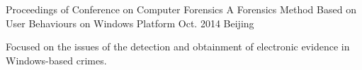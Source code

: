 \begin{cventries}
  \cventry
    {Proceedings of Conference on Computer Forensics}
    {A Forensics Method Based on User Behaviours on Windows Platform}
    {Oct. 2014}
    {Beijing}
    {
      \begin{cvitems}
        \item {Focused on the issues of the detection and obtainment of electronic evidence in Windows-based crimes.}
      \end{cvitems}
    }
\end{cventries}
